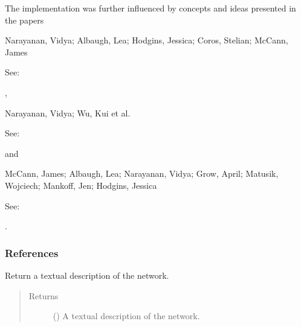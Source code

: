 \documentclass[letterpaper,10pt,english]{sphinxmanual}
\begin{document}
\begin{fulllineitems}
The implementation was further influenced by concepts and ideas presented
in the papers  %
\begin{footnote}[3]\sphinxAtStartFootnote
Narayanan, Vidya; Albaugh, Lea; Hodgins, Jessica; Coros, Stelian;
McCann, James 

See: 
%
\end{footnote},
\begin{footnote}[4]\sphinxAtStartFootnote
Narayanan, Vidya; Wu, Kui et al. 

See: 
%
\end{footnote} and
\begin{footnote}[5]\sphinxAtStartFootnote
McCann, James; Albaugh, Lea; Narayanan, Vidya; Grow, April;
Matusik, Wojciech; Mankoff, Jen; Hodgins, Jessica

See: 
%
\end{footnote}.
\subsubsection*{References}

\begin{fulllineitems}
\label{\detokenize{cockatoo:cockatoo.KnitNetwork.ToString}}
Return a textual description of the network.
\begin{quote}\begin{description}
\item[{Returns}] \leavevmode
{} () \textendash{} A textual description of the network.

\end{description}\end{quote}

\end{fulllineitems}
\end{fulllineitems}
\end{document}
